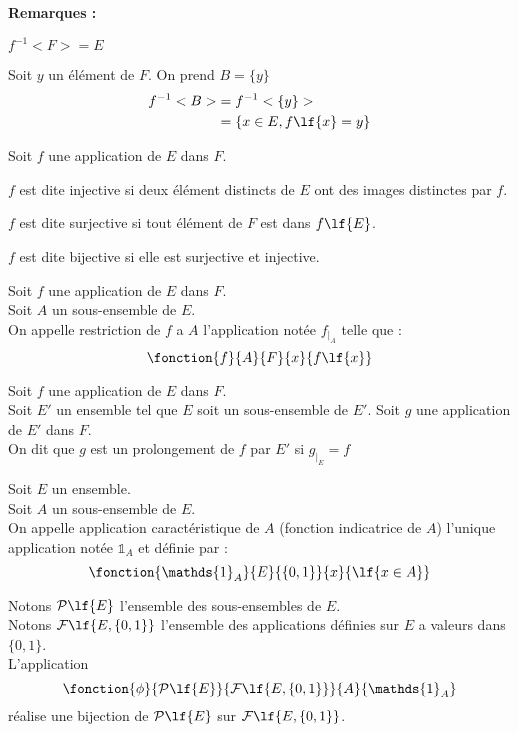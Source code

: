 \documentclass[12pt,twoside,a4paper]{article}
\begin{document}
		\textbf{Remarques :}
		\begin{liste}
			\item $f^{-1}<F> = E$
			\item Soit $y$ un \'el\'ement de $F$. On prend $B=\{y\}$
				$$\begin{aligned}
					f^{-1}<B>&=f^{-1}<\{y\}>\\
							 &=\{x\in E, f\lf{x}=y\}
				\end{aligned}$$
		\end{liste}
		\begin{defi}
			Soit $f$ une application de $E$ dans $F$.
			\begin{liste}
				\item $f$ est dite injective si deux \'el\'ement distincts de $E$ ont des images distinctes par $f$.
				\item $f$ est dite surjective si tout \'el\'ement de $F$ est dans $f\lf{E}$.
				\item $f$ est dite bijective si elle est surjective et injective.
			\end{liste}
		\end{defi}
		\begin{defi}
			\begin{liste}
				\item Soit $f$ une application de $E$ dans $F$. \\
					Soit $A$ un sous-ensemble de $E$. \\
					On appelle restriction de $f$ a $A$ l'application not\'ee $f_{|_A}$ telle que :
					$$\fonction{f}{A}{F}{x}{f\lf{x}}$$
				\item Soit $f$ une application de $E$ dans $F$. \\
					Soit $E'$ un ensemble tel que $E$ soit un sous-ensemble de $E'$.
					Soit $g$ une application de $E'$ dans $F$. \\
					On dit que $g$ est un prolongement de $f$ par $E'$ si $g_{|_E}=f$
			\end{liste}
		\end{defi}\newpage
		\begin{defi}
			Soit $E$ un ensemble. \\
			Soit $A$ un sous-ensemble de $E$. \\
			On appelle application caract\'eristique de $A$ (fonction indicatrice de $A$) l'unique application not\'ee $\mathds{1}_A$ et d\'efinie par :
			$$\fonction{\mathds{1}_A}{E}{\{0,1\}}{x}{\lf{x\in A}}$$
		\end{defi}
		\begin{prop}
			Notons $\mathcal{P}\lf{E}$ l'ensemble des sous-ensembles de $E$. \\
			Notons $\mathcal{F}\lf{E,\{0,1\}}$ l'ensemble des applications d\'efinies sur $E$ a valeurs dans $\{0,1\}$. \\
			L'application
			$$\fonction{\phi}{\mathcal{P}\lf{E}}{\mathcal{F}\lf{E,\{0,1\}}}{A}{\mathds{1}_A}$$
			r\'ealise une bijection de $\mathcal{P}\lf{E}$ sur $\mathcal{F}\lf{E,\{0,1\}}$.
		\end{prop}
\end{document}
